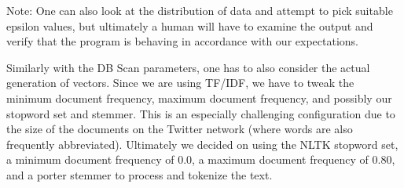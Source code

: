 Note: One can also look at the distribution of data and attempt to
pick suitable epsilon values, but ultimately a human will have to
examine the output and verify that the program is behaving in
accordance with our expectations.

Similarly with the DB Scan parameters, one has to also consider the
actual generation of vectors. Since we are using TF/IDF, we have to
tweak the minimum document frequency, maximum document frequency, and
possibly our stopword set and stemmer. This is an especially
challenging configuration due to the size of the documents on the
Twitter network (where words are also frequently
abbreviated). Ultimately we decided on using the NLTK stopword set, a
minimum document frequency of 0.0, a maximum document frequency of
0.80, and a porter stemmer to process and tokenize the text.